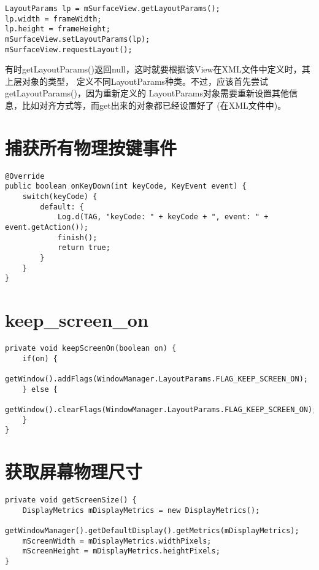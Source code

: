 ﻿\documentclass[a4paper,10pt]{article}
\begin{document}
\begin{verbatim}
LayoutParams lp = mSurfaceView.getLayoutParams();
lp.width = frameWidth;
lp.height = frameHeight;
mSurfaceView.setLayoutParams(lp);
mSurfaceView.requestLayout();
\end{verbatim}

  有时getLayoutParams()返回null，这时就要根据该View在XML文件中定义时，其上层对象的类型，
  定义不同LayoutParams种类。不过，应该首先尝试getLayoutParams()，因为重新定义的
  LayoutParams对象需要重新设置其他信息，比如对齐方式等，而get出来的对象都已经设置好了
  (在XML文件中)。

  \section[捕获所有物理按键事件]{捕获所有物理按键事件}
  \begin{verbatim}
@Override
public boolean onKeyDown(int keyCode, KeyEvent event) {
    switch(keyCode) {
        default: {
            Log.d(TAG, "keyCode: " + keyCode + ", event: " + event.getAction());
            finish();
            return true;
        }
    }
}
  \end{verbatim}

  \section[keep\_screen\_on]{keep\_screen\_on}
  \begin{verbatim}
private void keepScreenOn(boolean on) {
    if(on) {
        getWindow().addFlags(WindowManager.LayoutParams.FLAG_KEEP_SCREEN_ON);
    } else {
        getWindow().clearFlags(WindowManager.LayoutParams.FLAG_KEEP_SCREEN_ON);
    }
}
  \end{verbatim}

  \section[获取屏幕物理尺寸]{获取屏幕物理尺寸}
  \begin{verbatim}
private void getScreenSize() {
    DisplayMetrics mDisplayMetrics = new DisplayMetrics();
    getWindowManager().getDefaultDisplay().getMetrics(mDisplayMetrics);
    mScreenWidth = mDisplayMetrics.widthPixels;
    mScreenHeight = mDisplayMetrics.heightPixels;
}
  \end{verbatim}
\end{document}
